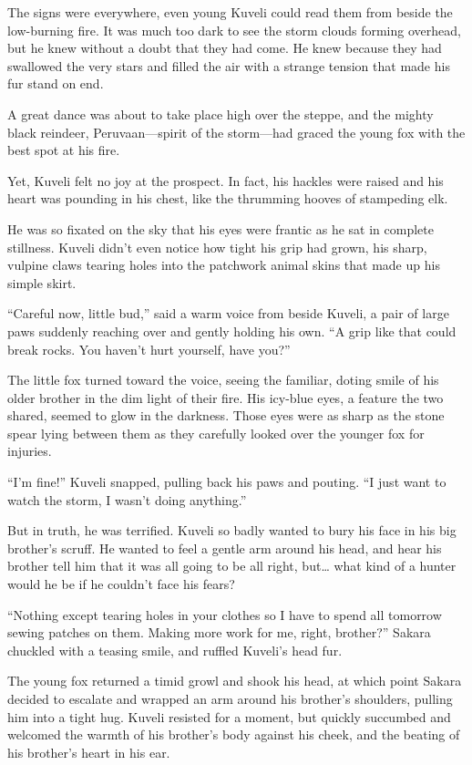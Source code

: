 The signs were everywhere, even young Kuveli could read them from beside the low-burning fire. It was much too dark to see the storm clouds forming overhead, but he knew without a doubt that they had come. He knew because they had swallowed the very stars and filled the air with a strange tension that made his fur stand on end.

A great dance was about to take place high over the steppe, and the mighty black reindeer, Peruvaan---spirit of the storm---had graced the young fox with the best spot at his fire.

Yet, Kuveli felt no joy at the prospect. In fact, his hackles were raised and his heart was pounding in his chest, like the thrumming hooves of stampeding elk.

He was so fixated on the sky that his eyes were frantic as he sat in complete stillness. Kuveli didn't even notice how tight his grip had grown, his sharp, vulpine claws tearing holes into the patchwork animal skins that made up his simple skirt.

``Careful now, little bud,'' said a warm voice from beside Kuveli, a pair of large paws suddenly reaching over and gently holding his own. ``A grip like that could break rocks. You haven't hurt yourself, have you?''

The little fox turned toward the voice, seeing the familiar, doting smile of his older brother in the dim light of their fire. His icy-blue eyes, a feature the two shared, seemed to glow in the darkness. Those eyes were as sharp as the stone spear lying between them as they carefully looked over the younger fox for injuries.

``I'm fine!'' Kuveli snapped, pulling back his paws and pouting. ``I just want to watch the storm, I wasn't doing anything.''

But in truth, he was terrified. Kuveli so badly wanted to bury his face in his big brother's scruff. He wanted to feel a gentle arm around his head, and hear his brother tell him that it was all going to be all right, but\ldots{} what kind of a hunter would he be if he couldn't face his fears?

``Nothing except tearing holes in your clothes so I have to spend all tomorrow sewing patches on them. Making more work for me, right, brother?'' Sakara chuckled with a teasing smile, and ruffled Kuveli's head fur.

The young fox returned a timid growl and shook his head, at which point Sakara decided to escalate and wrapped an arm around his brother's shoulders, pulling him into a tight hug. Kuveli resisted for a moment, but quickly succumbed and welcomed the warmth of his brother's body against his cheek, and the beating of his brother's heart in his ear.

